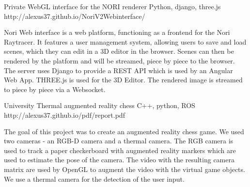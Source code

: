 \begin{cventries}
  \cventry
    {Private}
    {WebGL interface for the NORI renderer} %
    {Python, django, three.js} %
    {http://alexus37.github.io/NoriV2Webinterface/} %
    {
      \begin{cvitems} %
        \item {
        Nori Web interface is a web platform, functioning as a frontend for the Nori Raytracer. It features a user management system, allowing users to save and load scenes, which they can edit in a 3D editor in the browser. Scenes can then be rendered by the platform and will be streamed, piece by piece to the browser. The server uses Django to provide a REST API which is used by an Angular Web App. THREE.js is used for the 3D Editor. The rendered image is streamed to piece by piece via a Websocket.
        }
      \end{cvitems}
    }

  \cventry
    {University}
    {Thermal augmented reality chess} %
    {C++, python, ROS} %
    {http://alexus37.github.io/pdf/report.pdf} %
    {
      \begin{cvitems} %
        \item {
        The goal of this project was to create an augmented reality chess game. We used two cameras - an RGB-D camera and a thermal camera. The RGB camera is used to track a paper checkerboard with augmented reality markers which are used to estimate the pose of the camera. The video with the resulting camera matrix are used by OpenGL to augment the video with the virtual game objects. We use a thermal camera for the detection of the user input.
        }
      \end{cvitems}
    }
\end{cventries}
